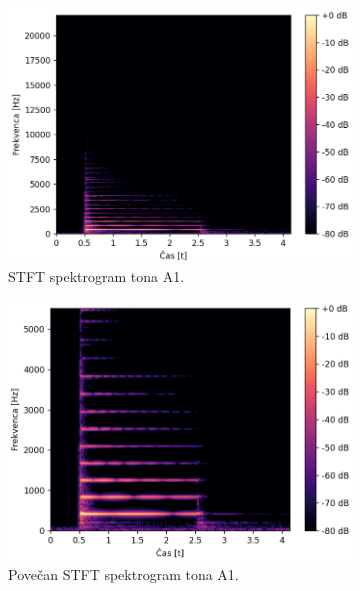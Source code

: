 \documentclass[a4paper, 12pt, openright]{book}
\begin{document}
\begin{figure}
    \centering
    \begin{subfigure}[t]{.45\textwidth}
        \centering
        \includegraphics[width=\linewidth]{stft.png}
        \caption{STFT spektrogram tona A1.}
        \label{fig:stft}
    \end{subfigure}%
    \hspace{1em}%
    \begin{subfigure}[t]{.45\textwidth}
        \centering
        \includegraphics[width=\linewidth]{stft_zoom.png}
        \caption{Povečan STFT spektrogram tona A1.}
        \label{fig:stft_zoom}
    \end{subfigure}
    \begin{subfigure}[t]{.45\textwidth}

\end{subfigure}
\end{figure}
\end{document}
